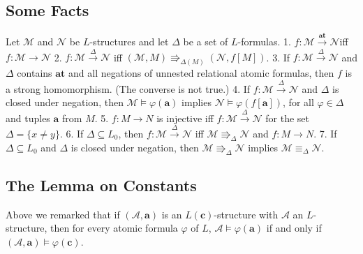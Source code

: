 \documentclass[a4paper,UKenglish,cleveref,autoref,thm-restate,12pt]{lipics-v2021-wjd}
\newcommand{\<}{\langle}
\renewcommand{\>}{\rangle}
\begin{document}

\subsection{Some Facts}\label{some-facts}

Let \(\mathcal M\) and \(\mathcal N\) be \(L\)-structures and let
\(\Delta\) be a set of \(L\)-formulas. 1.
\(f \colon \mathcal M \stackrel{\mathbf{at}}{\longrightarrow} \mathcal N\)iff
\(f \colon \mathcal M \rightarrow \mathcal N\) 2.
\(f \colon \mathcal M \stackrel{\Delta}{\longrightarrow} \mathcal N\)
iff \((\mathcal M, M) \Rrightarrow_{\Delta(M)} (\mathcal N, f[M])\). 3.
If \(f \colon \mathcal M \stackrel{\Delta}{\longrightarrow} \mathcal N\)
and \(\Delta\) contains \(\mathbf{at}\) and all negations of unnested
relational atomic formulas, then \(f\) is a strong homomorphism. (The
converse is not true.) 4. If
\(f \colon \mathcal M \stackrel{\Delta}{\longrightarrow} \mathcal N\)
and \(\Delta\) is closed under negation, then
\(\mathcal M \vDash \varphi(\mathbf a)\) implies
\(\mathcal N \vDash \varphi(f[\mathbf a])\), for all
\(\varphi \in \Delta\) and tuples \(\mathbf a\) from \(M\). 5.
\(f \colon M \to N\) is injective iff
\(f \colon \mathcal M \stackrel{\Delta}{\longrightarrow} \mathcal N\)
for the set \(\Delta = \{x \neq y\}\). 6. If \(\Delta \subseteq L_0\),
then
\(f \colon \mathcal M \stackrel{\Delta}{\longrightarrow} \mathcal N\)
iff \(\mathcal M \Rrightarrow_{\Delta} \mathcal N\) and
\(f \colon M \to N\). 7. If \(\Delta \subseteq L_0\) and \(\Delta\) is
closed under negation, then
\(\mathcal M \Rrightarrow_\Delta \mathcal N\) implies
\(\mathcal M \equiv_\Delta \mathcal N\).


\subsection{The Lemma on Constants}\label{the-lemma-on-constants}

Above we remarked that if \((\mathcal A, \mathbf a)\) is an
\(L(\mathbf c)\)-structure with \(\mathcal A\) an \(L\)-structure, then
for every atomic formula \(\varphi\) of \(L\),
\(\mathcal A \vDash \varphi(\mathbf a)\) if and only if
\((\mathcal A, \mathbf a) \vDash \varphi(\mathbf c)\).
\end{document}
